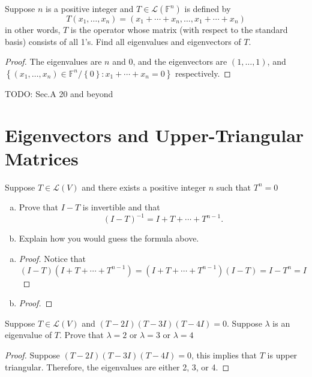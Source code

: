 \begin{exercise}
Suppose $n$ is a positive integer and $T \in \mathcal{L}(\mathbb{F}^n)$ is defined by \[
	T(x_1, \ldots ,x_n) = (x_1 + \cdots + x_n, \ldots , x_1 + \cdots + x_n)\]
in other words, $T$ is the operator whose matrix (with respect to the standard basis) consists of all 1's. Find all eigenvalues and eigenvectors of $T$.
\end{exercise}
\begin{proof}
	The eigenvalues are $n$ and $0$, and the eigenvectors are $(1, \ldots ,1)$, and $\left\{(x_1, \ldots ,x_n) \in \mathbb{F}^n / \left\{0\right\} : x_1 + \cdots +x_n = 0 \right\} $ respectively.
\end{proof}

TODO: Sec.A 20 and beyond

\section{Eigenvectors and Upper-Triangular Matrices}

\begin{exercise}
Suppose $T \in \mathcal{L}(V)$ and there exists a positive integer $n$ such that $T^{n} = 0$
\begin{enumerate}[(a)]
	\item Prove that $I - T$ is invertible and that \[
		      (I - T)^{-1} = I + T + \cdots + T^{n-1}.\]
	\item Explain how you would guess the formula above.
\end{enumerate}
\end{exercise}
\begin{enumerate}[(a)]
	\item \begin{proof}
		      Notice that \[
			      (I - T)(I + T + \cdots + T^{n - 1}) = (I + T + \cdots + T^{n - 1})(I - T) = I - T^n = I\]
	      \end{proof}
	\item \begin{proof}
	      \end{proof}
\end{enumerate}

\begin{exercise}
Suppose $T \in \mathcal{L}(V)$ and $(T-2I)(T-3I)(T-4I) = 0$. Suppose $\lambda$ is an eigenvalue of $T$. Prove that $\lambda = 2$ or $\lambda = 3$ or $\lambda = 4$
\end{exercise}
\begin{proof}
	Suppose $(T-2I)(T-3I)(T-4I) = 0$, this implies that $T$ is upper triangular. Therefore, the eigenvalues are either 2, 3, or 4.
\end{proof}

